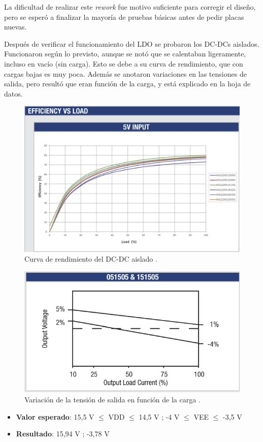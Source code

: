 La dificultad de realizar este \textit{rework} fue motivo suficiente para corregir el diseño, pero se esperó a finalizar la mayoría de pruebas básicas antes de pedir placas nuevas.

Después de verificar el funcionamiento del LDO se probaron los DC-DCs aislados. Funcionaron según lo previsto, aunque se notó que se calentaban ligeramente, incluso en vacío (sin carga). Esto se debe a su curva de rendimiento, que con cargas bajas es muy poca. Además se anotaron variaciones en las tensiones de salida, pero resultó que eran función de la carga, y está explicado en la hoja de datos.

\begin{figure}[H]
	\centering
	\includegraphics[width=0.7\linewidth]{fig/DCDC-eff}
	\caption{Curva de rendimiento del DC-DC aislado \cite{MurataDCDC}.}
\end{figure}

\begin{figure}[H]
	\centering
	\includegraphics[width=0.7\linewidth]{fig/DCDC-eff1}
	\caption{Variación de la tensión de salida en función de la carga \cite{MurataDCDC}.}
\end{figure}

\begin{itemize}
	\item \textbf{Valor esperado}: 15,5 V $\le$ VDD $\le$ 14,5 V ; -4 V $\le$ VEE $\le$ -3,5 V
	\item \textbf{Resultado}: 15,94 V ; -3,78 V
\end{itemize}

